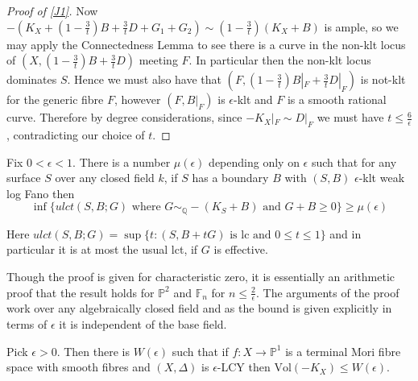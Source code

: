 \documentclass[a4paper,12pt]{book}
\newcommand{\Vol}{\text{Vol}}
\begin{document}
\begin{proof}[Proof of \autoref{J1}]
	Now $-(K_{X}+(1-\frac{3}{t})B+\frac{3}{t}D+G_{1}+G_{2}) \sim (1-\frac{3}{t})(K_{X}+B)$ is ample, so we may apply the Connectedness Lemma to see there is a curve in the non-klt locus of $(X,(1-\frac{3}{t})B+\frac{3}{t}D)$ meeting $F$. In particular then the non-klt locus dominates $S$. Hence we must also have that $(F,(1-\frac{3}{t})B|_{F}+\frac{3}{t}D|_{F})$ is not-klt for the generic fibre $F$, however $(F,B|_{F})$ is $\epsilon$-klt and $F$ is a smooth rational curve. Therefore by degree considerations, since $-K_{X}|_{F} \sim D|_{F}$ we must have $t \leq \frac{6}{\epsilon}$, contradicting our choice of $t$. 
\end{proof}

\begin{theorem}\label{aj}\cite[Theorem 2.8]{jiang2014boundedness}
	Fix $0<\epsilon<1$. There is a number $\mu(\epsilon)$ depending only on $\epsilon$ such that for any surface $S$ over any closed field $k$, if $S$ has a boundary $B$ with $(S,B)$ $\epsilon$-klt weak log Fano then \[\inf \{ulct (S,B;G) \text{ where } G \sim_{\mathbb{Q}}-(K_{S}+B) \text{ and } G+B \geq 0\}\geq \mu(\epsilon)\]
\end{theorem}

Here $ulct (S,B;G)= \sup\{t\colon  (S,B+tG) \text{ is lc and } 0 \leq t \leq 1\}$ and in particular it is at most the usual lct, if $G$ is effective.

Though the proof is given for characteristic zero, it is essentially an arithmetic proof that the result holds for $\mathbb{P}^{2}$ and $\mathbb{F}_{n}$ for $n \leq \frac{2}{\epsilon}$. The arguments of the proof work over any algebraically closed field and as the bound is given explicitly in terms of $\epsilon$ it is independent of the base field.

\begin{theorem}\label{J2}
	Pick $\epsilon>0$. Then there is $W(\epsilon)$ such that if $f\colon X \to \mathbb{P}^{1}$ is a terminal Mori fibre space with smooth fibres and $(X,\Delta)$ is $\epsilon$-LCY then $\Vol(-K_{X})\leq W(\epsilon)$.
\end{theorem}
\end{document}

